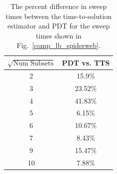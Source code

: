 \begin{table}[!ht]
\centering
\caption{The percent difference in sweep times between the time-to-solution estimator and PDT for the sweep times shown in Fig.~\ref{comp_lb_spiderweb}.}
\label{diff_lb_spiderweb}
\begin{tabular}{c|c}
\textbf{$\sqrt{\text{Num Subsets}}$} & \bf PDT vs. TTS \\ \hline
2&15.9\%\\ \hline
3&23.52\%\\ \hline
4&41.83\%\\ \hline
5&6.15\%\\ \hline
6&10.67\%\\ \hline
7&8.43\%\\ \hline
9&15.47\%\\ \hline
10&7.88\%
\end{tabular}
\end{table}

